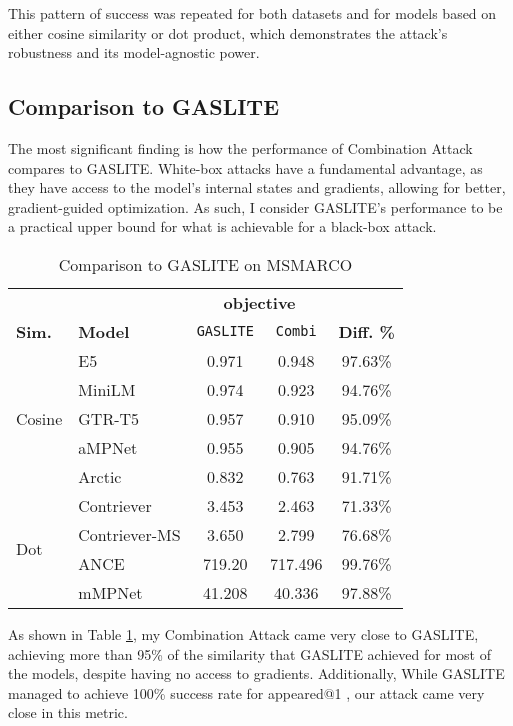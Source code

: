 \documentclass[a4paper, sigconf]{acmart}
\begin{document}
This pattern of success was repeated for both datasets and for models based on either cosine similarity or dot product, which demonstrates the attack's robustness and its model-agnostic power. 


\subsection{Comparison to GASLITE}

The most significant finding is how the performance of Combination Attack compares to GASLITE. White-box attacks have a fundamental advantage, as they have access to the model's internal states and gradients, allowing for better, gradient-guided optimization. As such, I consider GASLITE's performance to be a practical upper bound for what is achievable for a black-box attack. 

\begin{table}
\caption{Comparison to GASLITE on MSMARCO}
\label{table:gaslite}
  \begin{tabular}{ll|cc|c}
  \hline
  & & \multicolumn{2}{c|}{\textbf{objective}} & \\
  \textbf{Sim.} & \textbf{Model} & \texttt{GASLITE} & \texttt{Combi} & \textbf{Diff. \%} \\
  \hline
  \multirow{5}{*}{Cosine} & E5 & 0.971 & 0.948 & 97.63\% \\
  \hhline{~----}
  & MiniLM & 0.974 & 0.923 & 94.76\% \\
  \hhline{~----}
  & GTR-T5 & 0.957 & 0.910 & 95.09\% \\
  \hhline{~----}
  & aMPNet & 0.955 & 0.905 & 94.76\% \\
  \hhline{~----}
  & Arctic & 0.832 & 0.763 & 91.71\% \\
  \hline
  \multirow{4}{*}{Dot} & Contriever & 3.453 & 2.463 & 71.33\% \\
  \hhline{~----}
  & Contriever-MS & 3.650 & 2.799 & 76.68\% \\
  \hhline{~----}
  & ANCE & 719.20 & 717.496 & 99.76\% \\
  \hhline{~----}
  & mMPNet & 41.208 & 40.336 & 97.88\% \\
  \hline
 \end{tabular}
 \end{table}
 
As shown in Table \ref{table:gaslite}, my Combination Attack came very close to GASLITE, achieving more than 95\% of the similarity that GASLITE achieved for most of the models, despite having no access to gradients. Additionally, While GASLITE managed to achieve 100\% success rate for appeared@1 \cite{bentov2024}, our attack came very close in this metric. 
\end{document}

